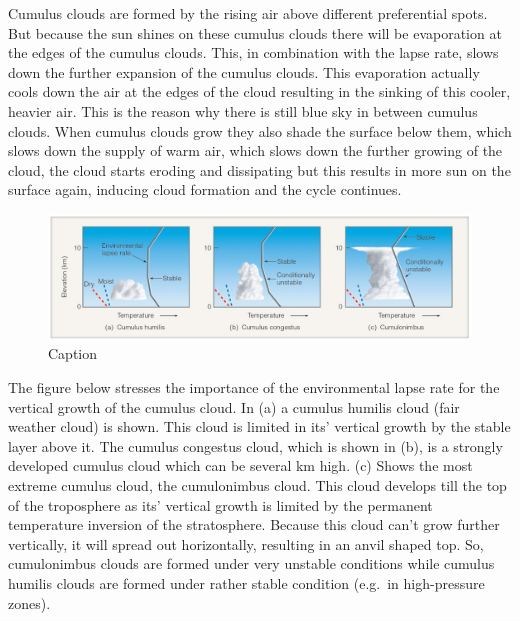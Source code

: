 \documentclass[12pt,oneside]{book}
\begin{document}
Cumulus clouds are formed by the rising air above different preferential
spots. But because the sun shines on these cumulus clouds there will be
evaporation at the edges of the cumulus clouds. This, in combination
with the lapse rate, slows down the further expansion of the cumulus
clouds. This evaporation actually cools down the air at the edges of the
cloud resulting in the sinking of this cooler, heavier air. This is the
reason why there is still blue sky in between cumulus clouds. When
cumulus clouds grow they also shade the surface below them, which slows
down the supply of warm air, which slows down the further growing of the
cloud, the cloud starts eroding and dissipating but this results in more
sun on the surface again, inducing cloud formation and the cycle
continues.

\begin{figure}

{\centering \includegraphics[width=0.8\linewidth]{figures/Figure318} 

}

\caption{Caption}\label{fig:Cumulus}
\end{figure}

The figure below stresses the importance of the environmental lapse rate
for the vertical growth of the cumulus cloud. In (a) a cumulus humilis
cloud (fair weather cloud) is shown. This cloud is limited in its'
vertical growth by the stable layer above it. The cumulus congestus
cloud, which is shown in (b), is a strongly developed cumulus cloud
which can be several km high. (c) Shows the most extreme cumulus cloud,
the cumulonimbus cloud. This cloud develops till the top of the
troposphere as its' vertical growth is limited by the permanent
temperature inversion of the stratosphere. Because this cloud can't grow
further vertically, it will spread out horizontally, resulting in an
anvil shaped top. So, cumulonimbus clouds are formed under very unstable
conditions while cumulus humilis clouds are formed under rather stable
condition (e.g.~in high-pressure zones).
\end{document}
